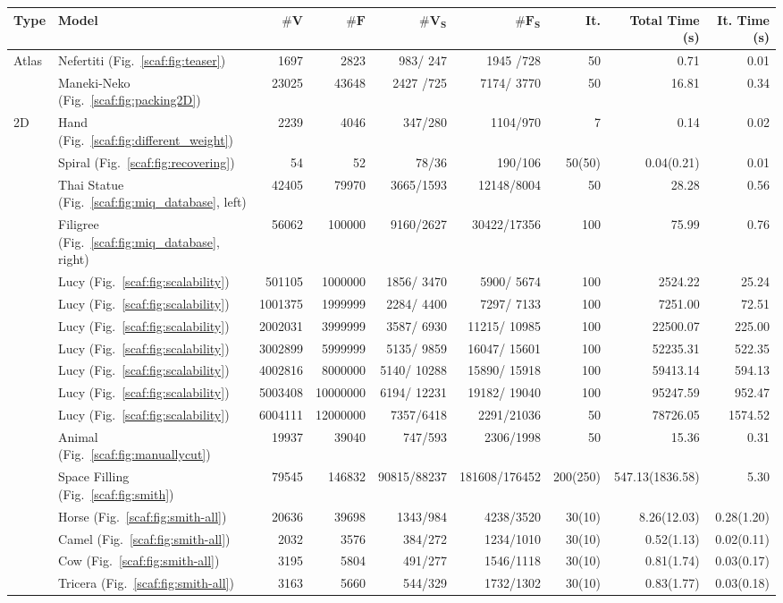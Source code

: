 \begin{table*}[t]
	\centering
	\begin{adjustbox}{width=\columnwidth,totalheight=\textheight,keepaspectratio}
	\begin{tabular}{llrrrrrrr}
\textbf{{Type}} &\textbf{Model} & $\mathbf{\#V}$	& $\mathbf{\#F}$ & $\mathbf{\#V_S}$	& $\mathbf{\#F_S}$ & \textbf{It.} & \textbf{{Total Time (s)}} & \textbf{{It. Time (s)}}\\
\hline
\multirow{2}{*}{Atlas}&Nefertiti (Fig.~\ref{scaf:fig:teaser})
&1697	&2823	&983/	247&	1945	/728&	50&	0.71&0.01\\
&Maneki-Neko (Fig.~\ref{scaf:fig:packing2D})
&23025	&43648	&2427	/725&	7174/	3770&	50&	16.81&0.34\\
\hline
\multirow{12}{*}{2D}
&Hand (Fig.~\ref{scaf:fig:different_weight})
&2239&4046&347/280&1104/970&7&0.14&0.02\\
&Spiral (Fig.~\ref{scaf:fig:recovering})
&54&52&78/36&190/106&50(50)&0.04(0.21)&0.01\\
&Thai Statue (Fig.~\ref{scaf:fig:miq_database}, left)
&42405&79970    &   3665/1593&12148/8004&50&28.28&0.56\\
&Filigree (Fig.~\ref{scaf:fig:miq_database}, right)
&56062&100000&9160/2627&30422/17356&100&75.99&0.76\\
&Lucy (Fig.~\ref{scaf:fig:scalability})&	501105&	1000000&	1856/	3470&	5900/	5674&	100&	2524.22&25.24\\
&Lucy (Fig.~\ref{scaf:fig:scalability})&	1001375&	1999999&	2284/	4400&	7297/	7133&	100&	7251.00&72.51\\
&Lucy (Fig.~\ref{scaf:fig:scalability})&	2002031&	3999999&	3587/	6930&	11215/	10985&	100&	22500.07&225.00\\
&Lucy (Fig.~\ref{scaf:fig:scalability})&	3002899&	5999999&	5135/	9859&	16047/	15601&	100&	52235.31&522.35\\
&Lucy (Fig.~\ref{scaf:fig:scalability})&	4002816&	8000000&	5140/	10288&	15890/	15918&	100&	59413.14&594.13\\
&Lucy (Fig.~\ref{scaf:fig:scalability})&	5003408&	10000000&	6194/	12231&	19182/	19040&	100&	95247.59&952.47\\
&Lucy (Fig.~\ref{scaf:fig:scalability})&6004111&12000000 & 7357/6418 & 2291/21036 &50 & 78726.05 &1574.52\\
&Animal (Fig.~\ref{scaf:fig:manuallycut})
&19937&39040&747/593&2306/1998&50&15.36&0.31\\
&Space Filling (Fig.~\ref{scaf:fig:smith})
&79545&146832&90815/88237&181608/176452&200(250)&547.13(1836.58)&5.30\\
&Horse (Fig.~\ref{scaf:fig:smith-all}) & 20636 & 39698 & 1343/984 & 4238/3520 & 30(10) & 8.26(12.03) & 0.28(1.20) \\
&Camel (Fig.~\ref{scaf:fig:smith-all}) & 2032 & 3576 & 384/272 & 1234/1010 & 30(10) & 0.52(1.13) & 0.02(0.11) \\
&Cow (Fig.~\ref{scaf:fig:smith-all}) & 3195 & 5804 & 491/277 & 1546/1118 & 30(10) & 0.81(1.74) & 0.03(0.17) \\
&Tricera (Fig.~\ref{scaf:fig:smith-all}) & 3163 & 5660 & 544/329 & 1732/1302 & 30(10) & 0.83(1.77) & 0.03(0.18) \\
\hline


\end{tabular}
\end{adjustbox}
\end{table*}
